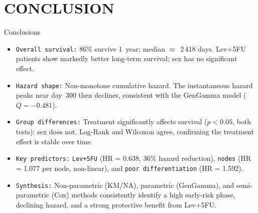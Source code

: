 \documentclass[aspectratio=169, 10pt]{beamer}
\begin{document}
\section{CONCLUSION}





\begin{frame}
	\begin{center}
		\colorbox{white}{}
	\end{center}
\end{frame}


\begin{frame}{Conclusions}
\large
\begin{itemize}\setlength\itemsep{6pt}  %
	\item[$\blacksquare$] \texttt{Overall survival:}
	86\% survive 1~year; median $\approx$~2\,418 days.
	Lev+5FU patients show markedly better long-term
	survival; sex has no significant effect.
	
	\item[$\blacksquare$] \texttt{Hazard shape:}
	Non-monotone cumulative hazard. The instantaneous
	hazard peaks near day~300 then declines,
	consistent with the GenGamma model ($Q = -0.481$).
	
	\item[$\blacksquare$] \texttt{Group differences:}
	Treatment significantly affects survival
	($p < 0.05$, both tests); sex does not.
	Log-Rank and Wilcoxon agree, confirming the
	treatment effect is stable over time.
	
	\item[$\blacksquare$] \texttt{Key predictors:}
	\texttt{Lev+5FU} (HR = 0.638, 36\% hazard
	reduction), \texttt{nodes} (HR = 1.077 per node,
	non-linear), and \texttt{poor differentiation}
	(HR = 1.592).
	
	\item[$\blacksquare$] \texttt{Synthesis:}
	Non-parametric (KM/NA), parametric (GenGamma),
	and semi-parametric (Cox) methods consistently
	identify a high early-risk phase, declining hazard,
	and a strong protective benefit from Lev+5FU.
	
\end{itemize}


\end{frame}
\end{document}
